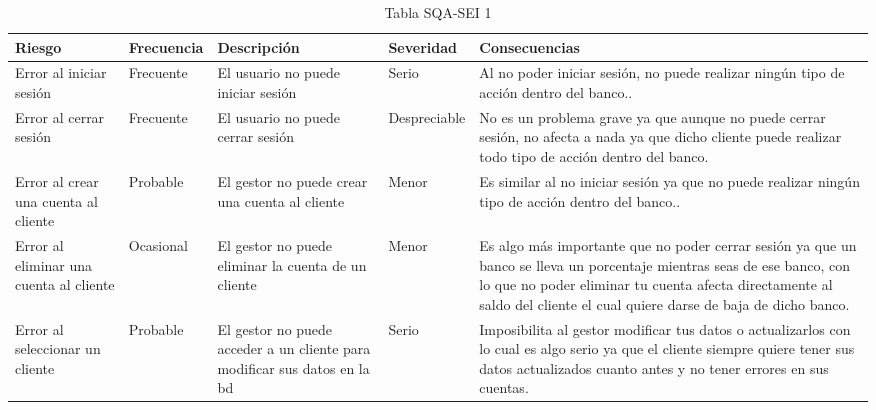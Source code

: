 \begin{table}[H]
	\centering
	\small
	\begin{tabularx}{\textwidth}{|>{\columncolor[gray]{0.8}}p{3cm}|p{1.9cm}|p{3cm}|p{2.1cm}|X|}
		\hline
		\rowcolor{gray}
		\textbf{Riesgo}                         & \textbf{Frecuencia} & \textbf{Descripción}                                                            & \textbf{Severidad} & \textbf{\textbf{Consecuencia}s}                                                                                                                                                                                                                   \\
		\hline
		Error al iniciar sesión                 & Frecuente           & El usuario no puede iniciar sesión                                              & Serio              & Al no poder iniciar sesión, no puede realizar ningún tipo de acción dentro del banco..                                                                                                                                                            \\
		\hline
		Error al cerrar sesión                  & Frecuente           & El usuario no puede cerrar sesión                                               & Despreciable       & No es un problema grave ya que aunque no puede cerrar sesión, no afecta a nada ya que dicho cliente puede realizar todo tipo de acción dentro del banco.                                                                                          \\
		\hline
		Error al crear una cuenta al cliente    & Probable            & El gestor no puede crear una cuenta al cliente                                  & Menor              & Es similar al no iniciar sesión ya que no puede realizar ningún tipo de acción dentro del banco..                                                                                                                                                 \\
		\hline
		Error al eliminar una cuenta al cliente & Ocasional           & El gestor no puede eliminar la cuenta de un cliente                             & Menor              & Es algo más importante que no poder cerrar sesión ya que un banco se lleva un porcentaje mientras seas de ese banco, con lo que no poder eliminar tu cuenta afecta directamente al saldo del cliente el cual quiere darse de baja de dicho banco. \\
		\hline
		Error al seleccionar un cliente         & Probable            & El gestor no puede acceder a un cliente para modificar sus datos en la \gls{bd} & Serio              & Imposibilita al gestor modificar tus datos o actualizarlos con lo cual es algo serio ya que el cliente siempre quiere tener sus datos actualizados cuanto antes y no tener errores en sus cuentas.                                                \\
		\hline
	\end{tabularx}
	\caption{Tabla SQA-SEI 1}
\end{table}


